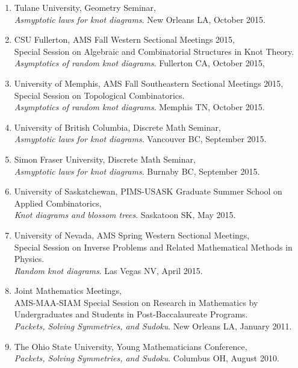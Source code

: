 \documentclass[letterpaper]{article}
\begin{document}
\begin{enumerate}
\item Tulane University, Geometry Seminar, \\
  \textit{Asmyptotic laws for knot diagrams}. New Orleans LA, October 2015.

\item CSU Fullerton, AMS Fall Western Sectional Meetings 2015,\\
  Special Session on Algebraic and Combinatorial Structures in Knot Theory. \\
  \textit{Asymptotics of random knot diagrams}. Fullerton CA, October 2015,

\item University of Memphis, AMS Fall Southeastern Sectional Meetings 2015,\\
  Special Session on Topological Combinatorics. \\
  \textit{Asymptotics of random knot diagrams}. Memphis TN, October 2015.

\item University of British Columbia, Discrete Math Seminar, \\
  \textit{Asmyptotic laws for knot diagrams}. Vancouver BC, September 2015.
  
\item Simon Fraser University, Discrete Math Seminar, \\
  \textit{Asmyptotic laws for knot diagrams}. Burnaby BC, September 2015.

\item University of Saskatchewan, PIMS-USASK Graduate Summer School on Applied Combinatorics, \\
  \textit{Knot diagrams and blossom trees}. Saskatoon SK, May 2015.
  
\item University of Nevada, AMS Spring Western Sectional Meetings,\\
  Special Session on Inverse Problems and Related Mathematical Methods in Physics. \\
  \textit{Random knot diagrams}. Las Vegas NV, April 2015.
  
\item Joint Mathematics Meetings, \\
  AMS-MAA-SIAM Special Session on Research in Mathematics by
  Undergraduates and Students in Post-Baccalaureate Programs.\\
  \textit{Packets, Solving Symmetries, and Sudoku}. New Orleans LA, January 2011.
  
\item The Ohio State University, Young Mathematicians Conference, \\
  \textit{Packets, Solving Symmetries, and Sudoku}. Columbus OH, August 2010.
\end{enumerate}
\end{document}
